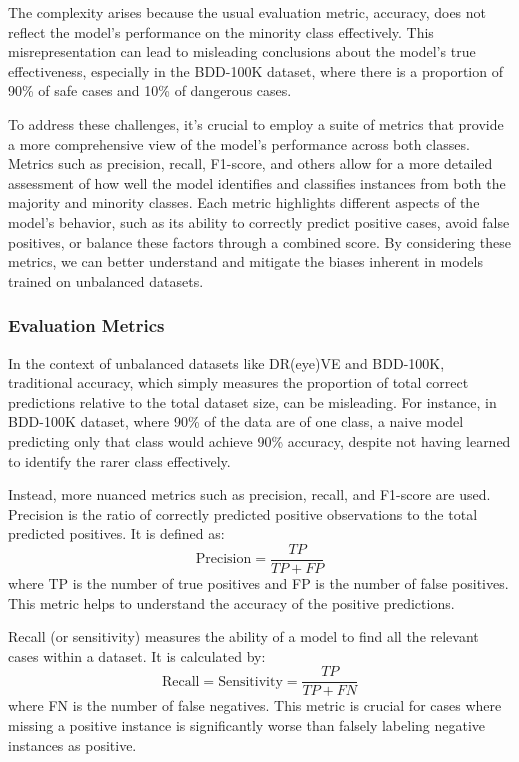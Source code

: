 The complexity arises because the usual evaluation metric, accuracy, does not 
reflect the model's performance on the minority class effectively. 
This misrepresentation can lead to misleading conclusions about the model's true 
effectiveness, especially in the BDD-100K dataset, where there is a proportion 
of 90\% of safe cases and 10\% of dangerous cases.

To address these challenges, it's crucial to employ a suite of metrics that 
provide a more comprehensive view of the model’s performance across both classes. 
Metrics such as precision, recall, F1-score, and others allow for a more detailed 
assessment of how well the model identifies and classifies instances from both the 
majority and minority classes. Each metric highlights different aspects of the 
model's behavior, such as its ability to correctly predict positive cases, avoid 
false positives, or balance these factors through a combined score. 
By considering these metrics, we can better understand 
and mitigate the biases inherent in models trained on unbalanced datasets.

\subsubsection*{Evaluation Metrics}
In the context of unbalanced datasets like DR(eye)VE and BDD-100K, traditional 
accuracy, which simply measures the proportion of total correct predictions 
relative to the total dataset size, can be misleading. For instance, in BDD-100K 
dataset, where 90\% of the data are of one class, a naive model predicting only 
that class would achieve 90\% accuracy, despite not having learned to identify 
the rarer class effectively.

Instead, more nuanced metrics such as precision, recall, and F1-score are used. 
Precision is the ratio of correctly predicted positive observations to the total 
predicted positives. It is defined as:
\begin{equation*}
    \text{Precision} = \frac{TP}{TP + FP}
\end{equation*}
where TP is the number of true positives and FP is the number of false positives. 
This metric helps to understand the accuracy of the positive predictions.

Recall (or sensitivity) measures the ability of a model to find all the relevant 
cases within a dataset. It is calculated by:
\begin{equation*}
    \text{Recall} = \text{Sensitivity} = \frac{TP}{TP + FN}
\end{equation*}
where FN is the number of false negatives. This metric is crucial for cases where 
missing a positive instance is significantly worse than falsely labeling negative 
instances as positive.

